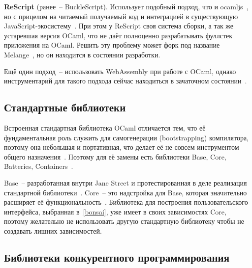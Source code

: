 \textbf{ReScript} (ранее~-- BuckleScript). Использует подобный подход, что и ocamljs~\cite{bobzhang-rawlambda},
но с прицелом на читаемый получаемый код и интеграцией в существующую JavaScript-экосистему~\cite{rescript-introduction}.
При этом у ReScript своя система сборки, а так же устаревшая версия OCaml, что не даёт полноценно
разрабатывать фуллстек приложения на OCaml. Решить эту проблему может форк под название Melange~\cite{melange},
но он находится в состоянии разработки.

Ещё один подход~-- использовать WebAssembly при работе с OCaml, однако
инструментарий для такого подхода сейчас находиться в зачаточном состоянии~\cite{ocaml-wasm}.

\subsection{Стандартные библиотеки}

Встроенная стандартная библиотека OCaml отличается тем, что её фундаментальная роль
служить для самогенерации (bootstrapping) компилятора, поэтому она небольшая и портативная,
что делает её не совсем инструментом общего назначения~\cite{rwo-prologue}.
Поэтому для её замены есть библиотеки Base, Core, Batteries, Containers~\cite{ocamlverse-libraries}.

Base~-- разработанная внутри Jane Street и протестированная в деле реализация стандартной библиотеки~\cite{ocamlverse-libraries}.
Core~-- это надстройка для Base, которая значительно расширяет её функциональность~\cite{janestreet-opensource}.
Библиотека для построения пользовательского интерфейса, выбранная в~\ref{bonsai}, уже имеет в своих зависимостях Core,
поэтому желательно не использовать другую стандартную библиотеку чтобы не создавать лишних зависимостей.

\subsection{Библиотеки конкурентного программирования}

